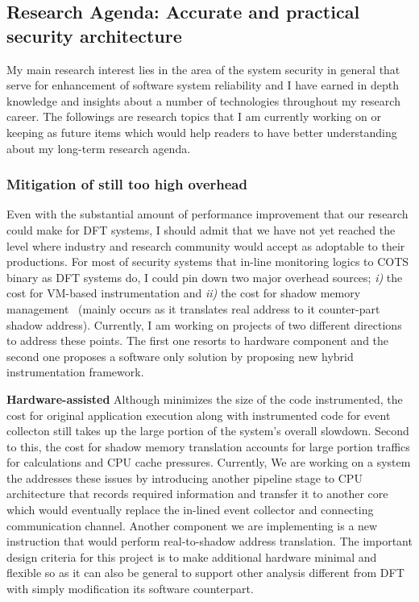 \documentclass[letterpaper, 10pt]{article}
\begin{document}
\begin{small}
\subsection*{Research Agenda: Accurate and practical security architecture}
%
My main research interest lies in the area of the system security in general
that serve for enhancement of software system reliability and I have earned in
depth knowledge and insights about a number of technologies throughout my
research career.
%
The followings are research topics that I am currently working on or keeping as
future items which would help readers to have better understanding about my
long-term research agenda.
%
\subsubsection*{Mitigation of still too high overhead}
%
Even with the substantial amount of performance improvement that our research
could make for DFT systems, I should admit that we have not yet reached the
level where industry and research community would accept as adoptable to their
productions.
%
For most of security systems that in-line monitoring logics to COTS binary as
DFT systems do, I could pin down two major overhead sources; {\it i)} the cost
for VM-based instrumentation and {\it ii)} the cost for shadow memory
management ~(mainly occurs as it translates real address to it counter-part
shadow address).
%
Currently, I am working on projects of two different directions to address
these points. The first one resorts to hardware component and the second one
proposes a software only solution by proposing new hybrid instrumentation
framework.

{\bf Hardware-assisted \SR} Although \SR minimizes the size of the code
instrumented, the cost for original application execution along with
instrumented code for event collecton still takes up the large portion of the
system's overall slowdown. Second to this, the cost for shadow memory
translation accounts for large portion traffics for calculations and CPU cache
pressures.
%
Currently, We are working on a system the addresses these issues by introducing
another pipeline stage to CPU architecture that records required information
and transfer it to another core which would eventually replace the in-lined
event collector and connecting communication channel. Another component we are
implementing is a new instruction that would perform real-to-shadow address
translation. The important design criteria for this project is to make
additional hardware minimal and flexible so as it can also be general to
support other analysis different from DFT with simply modification its software
counterpart.


\end{small}
\end{document}
